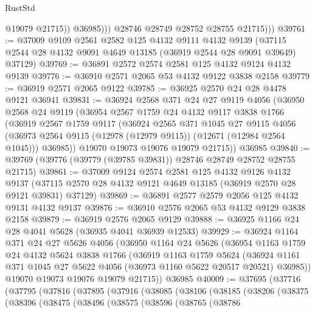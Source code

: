 \begin{lexlean}{RustStd}
\begin{coremodule}
                    @19079
                    @21715))
                @36985)))
          @28746
          @28749
          @28752
          @28755
          @21715)))
@39761 := @37009
    @9109
    @2561
    @2582
    @125
    @4132
    @9111
    @4132
    @9139
    (@37115 @2544 @28 @4132 @9091 @4649 @13185 (@36919 @2544 @28 @9091 @39649) @37129)
@39769 := @36891 @2572 @2574 @2581 @125 @4132 @9124 @4132 @9139
@39776 := @36910 @2571 @2065 @53 @4132 @9122 @3838 @2158
@39779 := @36919 @2571 @2065 @9122
@39785 := @36925 @2570 @24 @28 @4478 @9121 @36941
@39831 := @36924
    @2568
    @371
    @24
    @27
    @9119
    @4056
    (@36950
      @2568
      @24
      @9119
      (@36954
        @2567
        @1759
        @24
        @4132
        @9117
        @3838
        @1766
        (@36919
          @2567
          @1759
          @9117
          (@36924
            @2565
            @371
            @1045
            @27
            @9115
            @4056
            (@36973 @2564 @9115 (@12978 (@12979 @9115)) (@12671 (@12984 @2564 @1045)))
            @36985))
        @19070
        @19073
        @19076
        @19079
        @21715))
    @36985
@39840 := @39769 (@39776 (@39779 (@39785 @39831)) @28746 @28749 @28752 @28755 @21715)
@39861 := @37009
    @9124
    @2574
    @2581
    @125
    @4132
    @9126
    @4132
    @9137
    (@37115 @2570 @28 @4132 @9121 @4649 @13185 (@36919 @2570 @28 @9121 @39831) @37129)
@39869 := @36891 @2577 @2579 @2056 @125 @4132 @9131 @4132 @9137
@39876 := @36910 @2576 @2065 @53 @4132 @9129 @3838 @2158
@39879 := @36919 @2576 @2065 @9129
@39888 := @36925 @1166 @24 @28 @4041 @5628 (@36935 @4041 @36939 @12533)
@39929 := @36924
    @1164
    @371
    @24
    @27
    @5626
    @4056
    (@36950
      @1164
      @24
      @5626
      (@36954
        @1163
        @1759
        @24
        @4132
        @5624
        @3838
        @1766
        (@36919
          @1163
          @1759
          @5624
          (@36924 @1161 @371 @1045 @27 @5622 @4056 (@36973 @1160 @5622 @20517 @20521) @36985))
        @19070
        @19073
        @19076
        @19079
        @21715))
    @36985
@40009 := @37695
    (@37716
      (@37795
        (@37816
          (@37895
            (@37916
              (@38085
                (@38106
                  (@38185
                    (@38206
                      (@38375
                        (@38396
                          (@38475
                            (@38496
                              (@38575
                                (@38596
                                  (@38765
                                    (@38786

\end{coremodule}
\end{lexlean}
